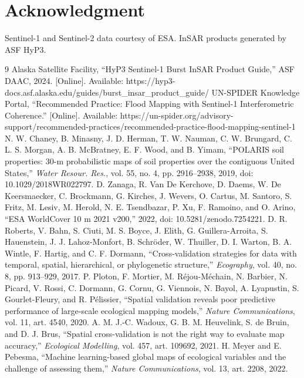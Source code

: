 \documentclass[10pt,conference]{IEEEtran}
\begin{document}
\section*{Acknowledgment}
Sentinel-1 and Sentinel-2 data courtesy of ESA. InSAR products generated by ASF
HyP3.

\balance
\begin{thebibliography}{9}
 Alaska Satellite Facility, ``HyP3 Sentinel-1 Burst InSAR
Product Guide,'' ASF DAAC, 2024. [Online]. Available:
https://hyp3-docs.asf.alaska.edu/guides/burst\_insar\_product\_guide/
 UN-SPIDER Knowledge Portal, ``Recommended Practice: Flood
Mapping with Sentinel-1 Interferometric Coherence.'' [Online]. Available:
https://un-spider.org/advisory-support/recommended-practices/recommended-practice-flood-mapping-sentinel-1
 N. W. Chaney, B. Minasny, J. D. Herman, T. W. Nauman,
C. W. Brungard, C. L. S. Morgan, A. B. McBratney, E. F. Wood, and
B. Yimam, ``POLARIS soil properties: 30-m probabilistic maps of soil
properties over the contiguous United States,'' \emph{Water Resour. Res.},
vol. 55, no. 4, pp. 2916--2938, 2019, doi: 10.1029/2018WR022797.
 D. Zanaga, R. Van De Kerchove, D. Daems, W. De
Keersmaecker, C. Brockmann, G. Kirches, J. Wevers, O. Cartus, M. Santoro,
S. Fritz, M. Lesiv, M. Herold, N. E. Tsendbazar, P. Xu, F. Ramoino, and
O. Arino, ``ESA WorldCover 10 m 2021 v200,'' 2022, doi:
10.5281/zenodo.7254221.
 D. R. Roberts, V. Bahn, S. Ciuti, M. S. Boyce,
J. Elith, G. Guillera-Arroita, S. Hauenstein, J. J. Lahoz-Monfort,
B. Schr\"oder, W. Thuiller, D. I. Warton, B. A. Wintle, F. Hartig, and
C. F. Dormann, ``Cross-validation strategies for data with temporal,
spatial, hierarchical, or phylogenetic structure,'' \emph{Ecography}, vol. 40,
no. 8, pp. 913--929, 2017.
 P. Ploton, F. Mortier, M. R\'ejou-M\'echain, N. Barbier,
N. Picard, V. Rossi, C. Dormann, G. Cornu, G. Viennois, N. Bayol, A. Lyapustin,
S. Gourlet-Fleury, and R. P\'elissier, ``Spatial validation reveals poor
predictive performance of large-scale ecological mapping models,''
\emph{Nature Communications}, vol. 11, art. 4540, 2020.
 A. M. J.-C. Wadoux, G. B. M. Heuvelink, S. de Bruin, and
D. J. Brus, ``Spatial cross-validation is not the right way to evaluate map
accuracy,'' \emph{Ecological Modelling}, vol. 457, art. 109692, 2021.
 H. Meyer and E. Pebesma, ``Machine learning-based global
maps of ecological variables and the challenge of assessing them,''
\emph{Nature Communications}, vol. 13, art. 2208, 2022.
\end{thebibliography}
\end{document}
